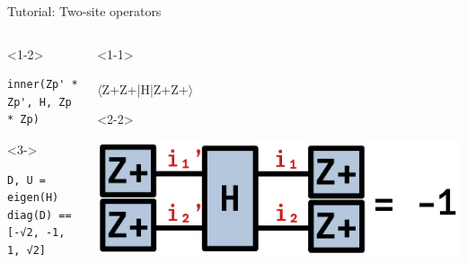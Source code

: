 \begin{frame}[fragile]{Tutorial: Two-site operators}

\begin{columns}

\begin{column}{5cm}

\begin{onlyenv}<1-2>
\begin{lstlisting}[language=JuliaLocal, style=julia, basicstyle=\small]
inner(Zp' * Zp', H, Zp * Zp)

\end{lstlisting}
\end{onlyenv}

\begin{onlyenv}<3->
\begin{lstlisting}[language=JuliaLocal, style=julia, basicstyle=\small]
D, U = eigen(H)
diag(D) == [-√2, -1, 1, √2]
\end{lstlisting}
\end{onlyenv}

\end{column}

\begin{column}{5cm}

\begin{onlyenv}<1-1>
~\\
~\\
$\langle$Z+Z+|H|Z+Z+$\rangle$ \\
\end{onlyenv}

\begin{onlyenv}<2-2>
\vspace*{0.0cm}
\begin{center}
\includegraphics[width=1.0\textwidth]{
  slides/assets/Zp1Zp2HZp1Zp2.png
}
\end{center}
\vspace*{0.0cm}
\end{onlyenv}



\end{column}
\end{columns}
\end{frame}
